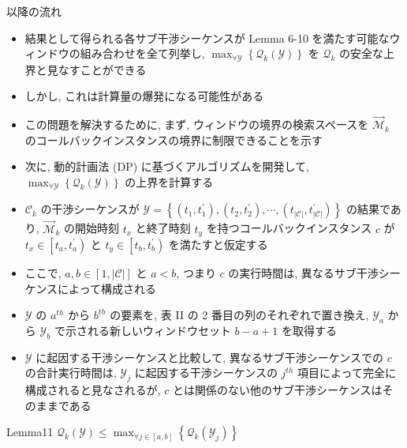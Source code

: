 \begin{frame}{以降の流れ}
    \begin{itemize}
        \item 結果として得られる各サブ干渉シーケンスが Lemma 6-10 を満たす可能なウィンドウの組み合わせを全て列挙し, $\max _{\forall \mathcal{Y}}\left\{\mathcal{Q}_{k}(\mathcal{Y})\right\}$ を $\mathcal{Q}_{k}$ の安全な上界と見なすことができる
        \item しかし, これは計算量の爆発になる可能性がある
        \item この問題を解決するために, まず, ウィンドウの境界の検索スペースを $\overrightarrow{\mathcal{M}}_{k}$ のコールバックインスタンスの境界に制限できることを示す
        \item 次に, 動的計画法 (DP) に基づくアルゴリズムを開発して, $\max _{\forall \mathcal{Y}}\left\{\mathcal{Q}_{k}(\mathcal{Y})\right\}$ の上界を計算する
    \end{itemize}
\end{frame}

\begin{frame}{}
    \begin{itemize}
        \item $\mathcal{C}_{k}$ の干渉シーケンスが $\mathcal{Y}=\left\{\left(t_{1}, t_{1}^{\prime}\right),\left(t_{2}, t_{2}^{\prime}\right), \cdots,\left(t_{|\mathcal{C}|}, t_{|\mathcal{C}|}^{\prime}\right)\right\}$ の結果であり, $\overrightarrow{\mathcal{M}}_{k}$ の開始時刻 $t_{x}$ と終了時刻 $t_{y}$ を持つコールバックインスタンス $c$ が $t_{x} \in\left[t_{a}, t_{a}^{\prime}\right)$ と $t_{y} \in\left[t_{b}, t_{b}^{\prime}\right)$ を満たすと仮定する
        \item ここで, $a, b \in[1,|\mathcal{C}|]$ と $a<b$, つまり $c$ の実行時間は, 異なるサブ干渉シーケンスによって構成される
        \item $\mathcal{Y}$ の $a^{t h}$ から $b^{t h}$ の要素を, 表 II の 2 番目の列のそれぞれで置き換え, $\mathcal{Y}_{a}$ から $\mathcal{Y}_{b}$ で示される新しいウィンドウセット $b-a+1$ を取得する
        \item $\mathcal{Y}$ に起因する干渉シーケンスと比較して, 異なるサブ干渉シーケンスでの $c$ の合計実行時間は, $\mathcal{Y}_{j}$ に起因する干渉シーケンスの $j^{t h}$ 項目によって完全に構成されると見なされるが, $c$ とは関係のない他のサブ干渉シーケンスはそのままである
    \end{itemize}
\end{frame}

\begin{frame}{Lemma11}
    $\mathcal{Q}_{k}(\mathcal{Y}) \leq \max _{\forall j \in[a, b]}\left\{\mathcal{Q}_{k}\left(\mathcal{Y}_{j}\right)\right\}$
\end{frame}

